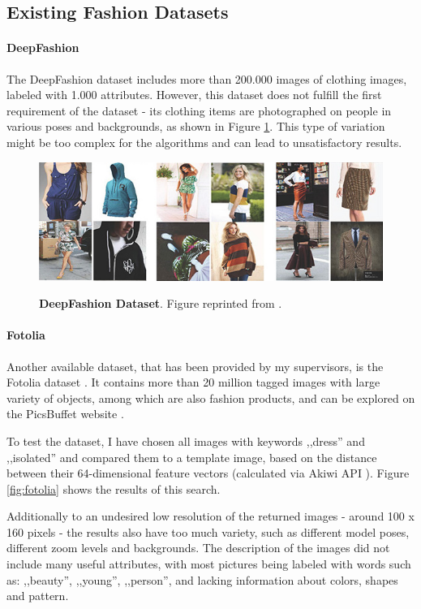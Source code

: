 \documentclass[12pt]{report}
\begin{document}
\subsection{Existing Fashion Datasets}
\paragraph{DeepFashion}
The DeepFashion dataset \cite{liu2016deepfashion} includes more than 200.000 images of clothing images, labeled with 1.000 attributes. However, this dataset does not fulfill the first requirement of the dataset - its clothing items are photographed on people in various poses and backgrounds, as shown in Figure \ref{fig:deepfashion}. This type of variation might be too complex for the algorithms and can lead to unsatisfactory results.

\begin{figure}[h]
\centering
{\includegraphics[width=\linewidth]{03_analysis/data/deepfashion}}
\caption{\label{fig:deepfashion} \textbf{DeepFashion Dataset}. Figure reprinted from \cite{liu2016deepfashion}.}
\end{figure}

\paragraph{Fotolia}
Another available dataset, that has been provided by my supervisors, is the Fotolia  dataset \cite{noauthor_fotolia_nodate}. It contains more than 20 million tagged images with large variety of objects, among which are also fashion products, and can be explored on the PicsBuffet website \cite{mackowiak_picsbuffet_nodate}.

To test the dataset, I have chosen all images with keywords ,,dress'' and ,,isolated'' and compared them to a template image, based on the distance between their 64-dimensional feature vectors (calculated via Akiwi API \cite{sonnenberg_akiwi_nodate}). Figure \ref{fig:fotolia} shows the results of this search. 

Additionally to an undesired low resolution of the returned images - around 100 x 160 pixels - the results also have too much variety, such as different model poses, different zoom levels and backgrounds. The description of the images did not include many useful attributes, with most pictures being labeled with words such as: ,,beauty'', ,,young'', ,,person'', and lacking information about colors, shapes and pattern.
\end{document}
